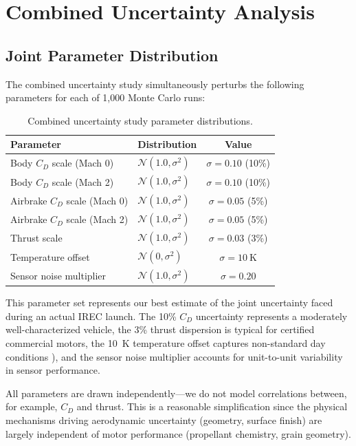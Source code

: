 \documentclass[11pt,letterpaper]{article}
\newcommand{\Cd}{C_D}
\begin{document}
\section{Combined Uncertainty Analysis}
\label{sec:combined}

\subsection{Joint Parameter Distribution}
\label{sec:combined_distribution}

The combined uncertainty study simultaneously perturbs the following parameters for each of 1{,}000 Monte Carlo runs:

\begin{table}[H]
\centering
\caption{Combined uncertainty study parameter distributions.}
\label{tab:combined_params}
\begin{tabular}{@{}llc@{}}
\toprule
\textbf{Parameter} & \textbf{Distribution} & \textbf{Value} \\
\midrule
Body $\Cd$ scale (Mach 0) & $\mathcal{N}(1.0, \sigma^2)$ & $\sigma = 0.10$ (10\%) \\
Body $\Cd$ scale (Mach 2) & $\mathcal{N}(1.0, \sigma^2)$ & $\sigma = 0.10$ (10\%) \\
Airbrake $\Cd$ scale (Mach 0) & $\mathcal{N}(1.0, \sigma^2)$ & $\sigma = 0.05$ (5\%) \\
Airbrake $\Cd$ scale (Mach 2) & $\mathcal{N}(1.0, \sigma^2)$ & $\sigma = 0.05$ (5\%) \\
Thrust scale & $\mathcal{N}(1.0, \sigma^2)$ & $\sigma = 0.03$ (3\%) \\
Temperature offset & $\mathcal{N}(0, \sigma^2)$ & $\sigma = \SI{10}{\kelvin}$ \\
Sensor noise multiplier & $\mathcal{N}(1.0, \sigma^2)$ & $\sigma = 0.20$ \\
\bottomrule
\end{tabular}
\end{table}

This parameter set represents our best estimate of the joint uncertainty faced during an actual IREC launch. The 10\% $\Cd$ uncertainty represents a moderately well-characterized vehicle, the 3\% thrust dispersion is typical for certified commercial motors, the \SI{10}{\kelvin} temperature offset captures non-standard day conditions ), and the sensor noise multiplier accounts for unit-to-unit variability in sensor performance.

All parameters are drawn independently---we do not model correlations between, for example, $\Cd$ and thrust. This is a reasonable simplification since the physical mechanisms driving aerodynamic uncertainty (geometry, surface finish) are largely independent of motor performance (propellant chemistry, grain geometry).
\end{document}
